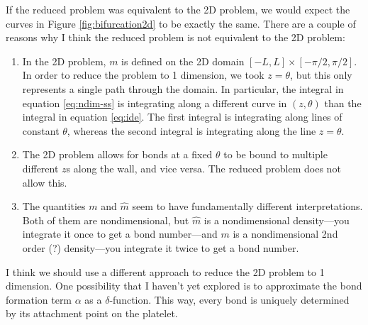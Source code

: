 \documentclass{article}
\begin{document}
If the reduced problem was equivalent to the 2D problem, we would
expect the curves in Figure \ref{fig:bifurcation2d} to be exactly the
same. There are a couple of reasons why I think the reduced problem is
not equivalent to the 2D problem:
\begin{enumerate}
\item In the 2D problem, $m$ is defined on the 2D domain $[-L, L]
  \times [-\pi/2, \pi/2]$. In order to reduce the problem to 1
  dimension, we took $z = \theta$, but this only represents a single
  path through the domain. In particular, the integral in equation
  \eqref{eq:ndim-ss} is integrating along a different curve in $(z,
  \theta)$ than the integral in equation \eqref{eq:ide}. The first
  integral is integrating along lines of constant $\theta$, whereas
  the second integral is integrating along the line $z = \theta$.
\item The 2D problem allows for bonds at a fixed $\theta$ to be bound
  to multiple different $z$s along the wall, and vice versa. The
  reduced problem does not allow this.
\item The quantities $m$ and $\hat{m}$ seem to have fundamentally
  different interpretations. Both of them are nondimensional, but
  $\hat{m}$ is a nondimensional density---you integrate it once to get
  a bond number---and $m$ is a nondimensional 2nd order (?)
  density---you integrate it twice to get a bond number.
\end{enumerate}

I think we should use a different approach to reduce the 2D problem to
1 dimension. One possibility that I haven't yet explored is to
approximate the bond formation term $\alpha$ as a
$\delta$-function. This way, every bond is uniquely determined by its
attachment point on the platelet.



\end{document}
